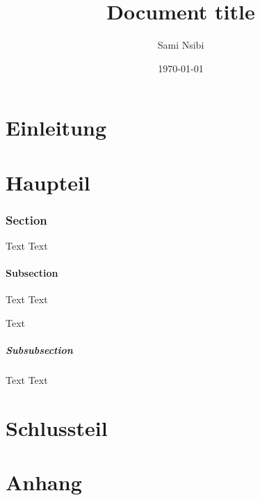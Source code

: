 \documentclass[11pt, a4paper, oneside]{scrreprt}
\title{Document title}
\author{Sami Nsibi}
\date{\today}
\begin{document}
\layout


\maketitle

\tableofcontents

\part{Einleitung}

\part{Haupteil}

\section{Section}
Text Text

\subsection{Subsection}
Text Text

Text

\subsubsection{Subsubsection}
Text Text

\part{Schlussteil}

\part{Anhang}
\end{document}

